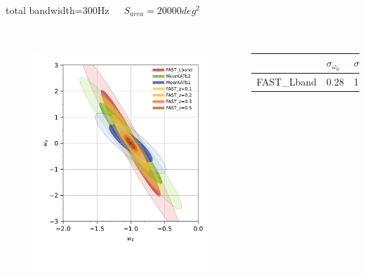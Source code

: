 \documentclass[UTF8]{beamer}
\begin{document}
\begin{frame}
\begin{columns}[c]
            total bandwidth=300Hz

            $S_{area} = 20000deg^2$
        \end{columns}
    \end{frame}

    \begin{frame}
        \frametitle{}
        \begin{columns}[c]
            \begin{figure}
                \centering
                \includegraphics[scale=0.3]{test-w0wa-withMeerKAT.pdf}
            \end{figure}
            \begin{table}[]
                \begin{tabular}{l|ll}
                \hline
                                     & $\sigma_{\omega_0}$ & $\sigma_{\omega_a}$ \\ \hline
                FAST\_Lband          & 0.28                & 1.33                \\

\end{tabular}
\end{table}
\end{columns}
\end{frame}
\end{document}

